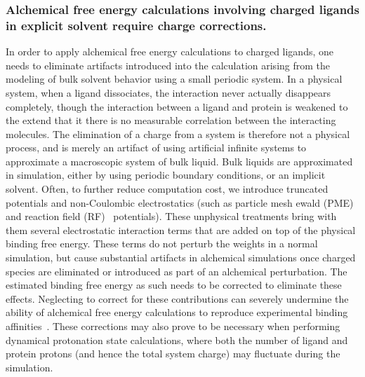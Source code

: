 \documentclass[10pt,final]{article}
\begin{document}
\subsubsection*{Alchemical free energy calculations involving charged ligands in explicit solvent require charge corrections.}
In order to apply alchemical free energy calculations to charged ligands, one needs to eliminate artifacts introduced into the calculation arising from the modeling of bulk solvent behavior using a small periodic system.
%
In a physical system, when a ligand dissociates, the interaction never actually disappears completely, though the interaction between a ligand and protein is weakened to the extend that it there is no measurable correlation between the interacting molecules.
%
The elimination of a charge from a system is therefore not a physical process, and is merely an artifact of using artificial infinite systems to approximate a macroscopic system of bulk liquid.
%
Bulk liquids are approximated in simulation, either by using periodic boundary conditions, or an implicit solvent.
%
Often, to further reduce computation cost, we introduce truncated potentials and non-Coulombic electrostatics (such as particle mesh ewald (PME)~\autocite{Essmann1995a} and reaction field (RF)~\autocite{Tironi1995a} potentials). 
%
These unphysical treatments bring with them several electrostatic interaction terms that are added on top of the physical binding free energy.
%
These terms do not perturb the weights in a normal simulation, but cause substantial artifacts in alchemical simulations once charged species are eliminated or introduced as part of an alchemical perturbation.
%
The estimated binding free energy as such needs to be corrected to eliminate these effects.
%
Neglecting to correct for these contributions can severely undermine the ability of alchemical free energy calculations to reproduce experimental binding affinities~\autocite{Rocklin2013b,Muddana2014a}.
%
These corrections may also prove to be necessary when performing dynamical protonation state calculations, where both the number of ligand and protein protons (and hence the total system charge) may fluctuate during the simulation.
\end{document}
